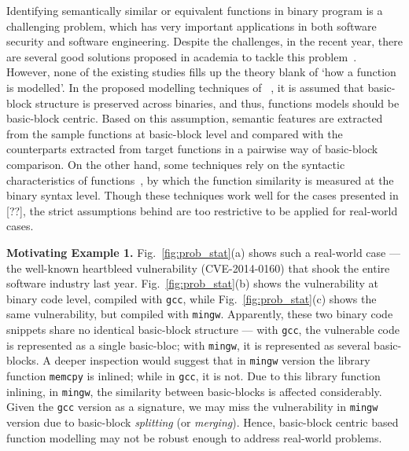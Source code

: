 Identifying semantically similar or equivalent functions in binary program is a challenging problem, which has very important applications in both software security and software engineering. Despite the challenges, in the recent year, there are several good solutions proposed in academia to tackle this problem~\cite{pewnycross,ruttenberg2014identifying,egele2014blanket,luo2014semantics}. %
However, none of the existing studies fills up the theory blank of \lq{}how a function is modelled\rq. In the proposed modelling techniques of {\color{red}{using XXX}}~\cite{pewnycross,luo2014semantics}, it is assumed that basic-block structure is preserved across binaries, and thus, functions models should be  basic-block centric. Based on this assumption, semantic features are extracted from the sample functions at basic-block level and compared with the counterparts extracted from target functions in a pairwise way of basic-block comparison. On the other hand, some techniques rely on the syntactic characteristics of functions~\cite{avid2014tracelet,jang2011bitshred}, by which the function similarity is measured at the binary syntax level. Though these techniques work well for the cases presented in [??], %
the strict assumptions behind are too restrictive to be applied for real-world cases.

\noindent\textbf{Motivating Example 1.} Fig.~\ref{fig:prob_stat}(a) shows such a real-world case --- the  well-known heartbleed vulnerability (CVE-2014-0160) that shook the entire software industry last year. Fig.~\ref{fig:prob_stat}(b) shows the vulnerability at binary code level, compiled with \texttt{gcc}, while Fig.~\ref{fig:prob_stat}(c)  shows the same vulnerability, but compiled with \texttt{mingw}. Apparently, these two binary code snippets share no identical basic-block structure --- with \texttt{gcc}, the vulnerable code is represented as a single basic-bloc;  with \texttt{mingw}, it is represented as several basic-blocks. A deeper inspection would suggest that in \texttt{mingw} version the library function \texttt{memcpy} is inlined; while in \texttt{gcc}, it is not. Due to this library function inlining, in \texttt{mingw}, the similarity between basic-blocks is affected considerably. Given the \texttt{gcc} version as a signature, we may miss the vulnerability in \texttt{mingw} version due to basic-block \textit{splitting} (or \textit{merging}). Hence, basic-block centric based function modelling may not be robust enough to address real-world problems.

